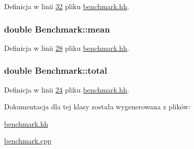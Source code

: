 Definicja w linii \hyperlink{benchmark_8hh_source_l00032}{32} pliku \hyperlink{benchmark_8hh_source}{benchmark.\-hh}.

\hypertarget{class_benchmark_aa88092b6164ad7d1243162d3012f729a}{
\subsubsection[{mean}]{\setlength{\rightskip}{0pt plus 5cm}double Benchmark\-::mean\hspace{0.3cm}{\ttfamily [private]}}}\label{class_benchmark_aa88092b6164ad7d1243162d3012f729a}


Definicja w linii \hyperlink{benchmark_8hh_source_l00028}{28} pliku \hyperlink{benchmark_8hh_source}{benchmark.\-hh}.

\hypertarget{class_benchmark_a7130c0718e3a3ab2fea70285dab122a2}{
\subsubsection[{total}]{\setlength{\rightskip}{0pt plus 5cm}double Benchmark\-::total\hspace{0.3cm}{\ttfamily [private]}}}\label{class_benchmark_a7130c0718e3a3ab2fea70285dab122a2}


Definicja w linii \hyperlink{benchmark_8hh_source_l00024}{24} pliku \hyperlink{benchmark_8hh_source}{benchmark.\-hh}.



Dokumentacja dla tej klasy została wygenerowana z plików\-:\begin{DoxyCompactItemize}
\item 
\hyperlink{benchmark_8hh}{benchmark.\-hh}\item 
\hyperlink{benchmark_8cpp}{benchmark.\-cpp}\end{DoxyCompactItemize}
